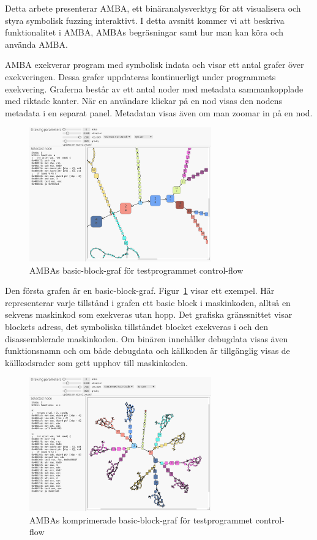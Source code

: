Detta arbete presenterar AMBA, ett
binäranalysverktyg för att visualisera och styra symbolisk fuzzing interaktivt.
I detta avsnitt kommer vi att beskriva funktionalitet i AMBA, AMBAs
begräsningar samt hur man kan köra och använda AMBA.

AMBA exekverar program med symbolisk indata och visar ett antal grafer
över exekveringen. Dessa grafer uppdateras kontinuerligt under programmets
exekvering. Graferna består av ett antal noder med metadata sammankopplade
med riktade kanter. När en användare klickar på en nod visas den nodens metadata
i en separat panel. Metadatan visas även om man zoomar in på en nod.

\begin{figure}
    \centering
    \includegraphics[width=0.7\textwidth]{figures/graph_basic_block.png}
    \caption{
        AMBAs basic-block-graf för testprogrammet control-flow
    }\label{fig:graf-basic}
\end{figure}

Den första grafen är en basic-block-graf. Figur~\ref{fig:graf-basic} visar ett
exempel. Här representerar varje tillstånd i grafen ett basic block i
maskinkoden, alltså en sekvens maskinkod som exekveras utan hopp. Det grafiska
gränssnittet visar blockets adress, det symboliska tillståndet blocket exekveras
i och den disassemblerade maskinkoden. Om binären innehåller debugdata visas
även funktionsnamn och om både debugdata och källkoden är tillgänglig visas de
källkodsrader som gett upphov till maskinkoden.

\begin{figure}
    \centering
    \includegraphics[width=0.7\textwidth]{figures/graph_block_compressed.png}
    \caption{
        AMBAs komprimerade basic-block-graf för testprogrammet control-flow
    }\label{fig:graf-compressed}
\end{figure}

